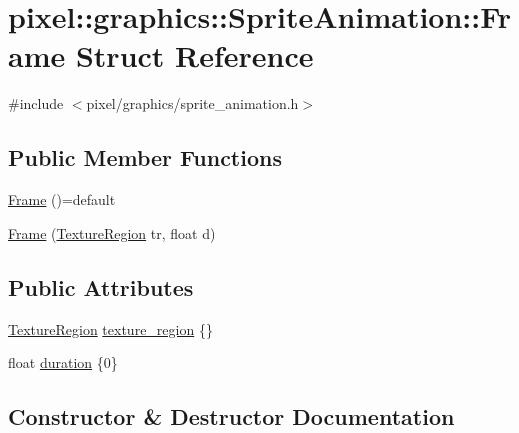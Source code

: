 \hypertarget{structpixel_1_1graphics_1_1_sprite_animation_1_1_frame}{}\section{pixel\+:\+:graphics\+:\+:Sprite\+Animation\+:\+:Frame Struct Reference}
\label{structpixel_1_1graphics_1_1_sprite_animation_1_1_frame}


{\ttfamily \#include $<$pixel/graphics/sprite\+\_\+animation.\+h$>$}

\subsection*{Public Member Functions}
\begin{DoxyCompactItemize}
\item 
\hyperlink{structpixel_1_1graphics_1_1_sprite_animation_1_1_frame_af7fd6120dff92eacb8a87927f2071cb9}{Frame} ()=default
\item 
\hyperlink{structpixel_1_1graphics_1_1_sprite_animation_1_1_frame_a4f3175b3ddd5b16c7b1ba45fb33cf6ae}{Frame} (\hyperlink{structpixel_1_1graphics_1_1_texture_region}{Texture\+Region} tr, float d)
\end{DoxyCompactItemize}
\subsection*{Public Attributes}
\begin{DoxyCompactItemize}
\item 
\hyperlink{structpixel_1_1graphics_1_1_texture_region}{Texture\+Region} \hyperlink{structpixel_1_1graphics_1_1_sprite_animation_1_1_frame_af723e632a129c9f9fded4a1b35dd378c}{texture\+\_\+region} \{\}
\item 
float \hyperlink{structpixel_1_1graphics_1_1_sprite_animation_1_1_frame_af34e2c86d249c6d29e730ea20e8f301e}{duration} \{0\}
\end{DoxyCompactItemize}


\subsection{Constructor \& Destructor Documentation}
\mbox{\label{structpixel_1_1graphics_1_1_sprite_animation_1_1_frame_af7fd6120dff92eacb8a87927f2071cb9}} 
